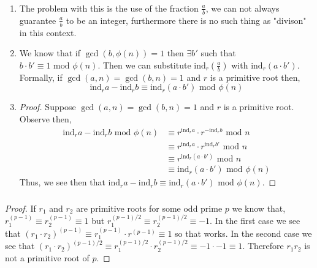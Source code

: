 \documentclass[class=article, crop=false]{standalone}
\def\ind{{\text{ind}}}
\begin{document}
\subsubsection{}
\begin{enumerate}
  \item
    The problem with this is the use of the fraction $\frac{a}{b}$, we can not
    always guarantee $\frac{a}{b}$ to be an integer, furthermore there is no such
    thing as "divison" in this context.

  \item
    We know that if $\gcd(b,\phi(n))=1$ then $\exists b'$ such that $b\cdot b' \equiv 1\mbox{ mod } \phi(n)$.
    Then we can substitute $\ind_r (\frac{a}{b})$ with $\ind_r (a\cdot b')$.
    Formally, if $\gcd(a,n)=\gcd(b,n)=1$ and $r$ is a primitive root then,
    $$\ind_r a - \ind_r b \equiv \ind_r (a \cdot b') \mbox{ mod } \phi(n)$$

  \item
    \begin{proof}
      Suppose $\gcd(a,n) = \gcd(b,n) = 1$ and $r$ is a primitive root.
      Observe then,
      \begin{align*}
        \ind_r a - \ind_r b \mbox{ mod } \phi(n)
        &\equiv r^{\ind_r a} \cdot r^{-\ind_r b} \mbox{ mod } n \\
        &\equiv r^{\ind_r a} \cdot r^{\ind_r b'} \mbox{ mod } n \\
        &\equiv r^{\ind_r (a\cdot b')} \mbox{ mod } n \\
        &\equiv \ind_r(a\cdot b') \mbox{ mod } \phi(n)
      \end{align*}
      Thus, we see then that $\ind_r a - \ind_r b \equiv \ind_r (a \cdot b') \mbox{ mod } \phi(n)$.
    \end{proof}

  \end{enumerate}

\subsubsection{}
\begin{proof}
	If $r_1$ and $r_2$ are primitive roots for some odd prime $p$ we know that,
	$r_1^{(p-1)} \equiv r_2^{(p-1)} \equiv 1$ but
	$r_1^{(p-1)/2} \equiv r_2^{(p-1)/2} \equiv -1$. In the first case we see that
	$(r_1\cdot r_2)^{(p-1)} \equiv r_1^{(p-1)} \cdot r^{(p-1)} \equiv 1$ so that works.
	In the second case we see that
	$(r_1\cdot r_2)^{(p-1)/2} \equiv r_1^{(p-1)/2} \cdot r_2^{(p-1)/2} \equiv -1\cdot -1 \equiv 1$.
	Therefore $r_1 r_2$ is not a primitive root of $p$.
\end{proof}
\end{document}
